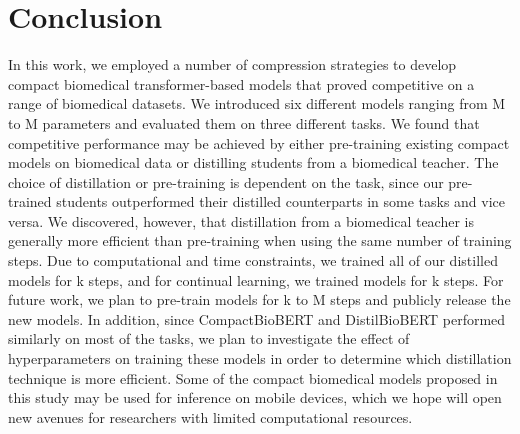 \documentclass{article}
\begin{document}
\label{disc}

\section{Conclusion}
\label{concl}
In this work, we employed a number of compression strategies to develop compact biomedical transformer-based models that proved competitive on a range of biomedical datasets. We introduced six different models ranging from M to M parameters and evaluated them on three different tasks. We found that competitive performance may be achieved by either pre-training existing compact models on biomedical data or distilling students from a biomedical teacher. The choice of distillation or pre-training is dependent on the task, since our pre-trained students outperformed their distilled counterparts in some tasks and vice versa.
We discovered, however, that distillation from a biomedical teacher is generally more efficient than pre-training when using the same number of training steps. Due to computational and time constraints, we trained all of our distilled models for k steps, and for continual learning, we trained models for k steps. For future work, we plan to pre-train models for k to M steps and publicly release the new models. In addition, since CompactBioBERT and DistilBioBERT performed similarly on most of the tasks, we plan to investigate the effect of hyperparameters on training these models in order to determine which distillation technique is more efficient. Some of the compact biomedical models proposed in this study may be used for inference on mobile devices, which we hope will open new avenues for researchers with limited computational resources.
\end{document}
